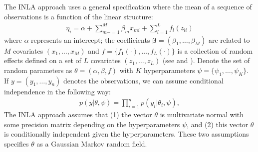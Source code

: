 \documentclass[11pt]{amsart}
\theoremstyle{plain}
\theoremstyle{definition}
\theoremstyle{remark}
\begin{document}
The INLA approach uses a general specification where the mean of a sequence of
observations is a function of the linear structure:
\begin{align*}
  \eta_i = \alpha +\sum_{m-=1}^M\beta_mx_{mi}+\sum_{l=1}^Lf_l(z_{li})
\end{align*}
where $\alpha$ represents an intercept; the coefficients
$\mathbf{\beta} = (\beta_1,\ldots,\beta_M)$ are related to $M$ covariates
$(x_1,\ldots,x_M)$ and $f = \{f_1(\cdot),\ldots,f_L(\cdot)\}$ is a collection of
random effects defined on a set of $L$ covariates $(z_1,\ldots,z_L)$ (see
\cite{Rue2009} and \cite{Blangiardo2013}). Denote the set of random parameters as
$\theta = (\alpha,\beta,f)$ with $K$ hyperparameters $\psi =
\{\psi_1,\ldots,\psi_K\}$. If $y=(y_1,\ldots,y_n)$ denotes the observations, we
can assume conditional independence in the following way:
\begin{align*}
  p(y|\theta,\psi)=\prod_{i=1}^np(y_i|\theta_i,\psi),
\end{align*}
The INLA approach assumes that (1) the vector $\theta$ is multivariate normal with
some precision matrix depending on the hyperparameters $\psi$, and (2) this vector
$\theta$ is conditionally independent given the hyperparameters. These two
assumptions specifies $\theta$ as a Gaussian Markov random field.
\end{document}
